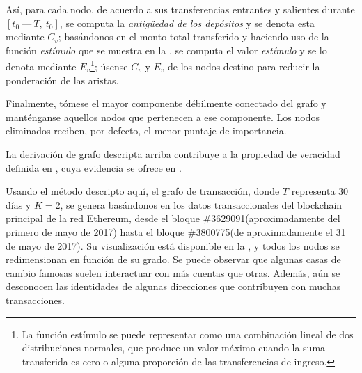 Así, para cada nodo, de acuerdo a sus transferencias entrantes y salientes durante $[t_0\ —\ T,\ t_0]$, se computa la \textit{antigüedad de los depósitos} y se denota esta mediante $C_v$; basándonos en el monto total transferido y haciendo uso de la función \textit{estímulo} que se muestra en la , se computa el valor \textit{estímulo} y se lo denota mediante $E_v$\footnote{La función estímulo se puede representar como una combinación lineal de dos distribuciones normales, que produce un valor máximo cuando la suma transferida es cero o alguna proporción de las transferencias de ingreso.}; úsense $C_v$ y $E_v$ de los nodos destino para reducir la ponderación de las aristas.

Finalmente, tómese el mayor componente débilmente conectado del grafo y manténganse aquellos nodos que pertenecen a ese componente. Los nodos eliminados reciben, por defecto, el menor puntaje de importancia.

La derivación de grafo descripta arriba contribuye a la propiedad de veracidad definida en , cuya evidencia se ofrece en .

Usando el método descripto aquí, el grafo de transacción, donde $T$ representa 30 días y $K=2$, se genera basándonos en los datos transaccionales del blockchain principal de la red Ethereum, desde el bloque \#3629091(aproximadamente del primero de mayo de 2017) hasta el bloque \#3800775(de aproximadamente el 31 de mayo de 2017). Su visualización está disponible en la , y todos los nodos se redimensionan en función de su grado. Se puede observar que algunas casas de cambio famosas suelen interactuar con más cuentas que otras. Además, aún se desconocen las identidades de algunas direcciones que contribuyen con muchas transacciones.

